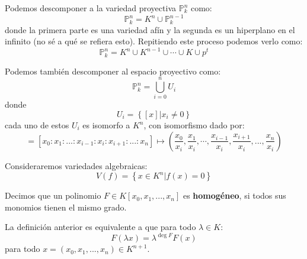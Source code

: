 \documentclass[12pt]{report}
\newcounter{it}
\theoremstyle{largebreak}
\begin{document}
    \begin{obs}
        Podemos descomponer a la variedad proyectiva $\mathbb{P}^n_k$ como:
        \begin{equation*}
            \mathbb{P}^n_k=K^n\cup \mathbb{P}^{ n-1}_k
        \end{equation*}
        donde la primera parte es una variedad afín y la segunda es un hiperplano en el infinito (no sé a qué se refiera esto). Repitiendo este proceso podemos verlo como:
        \begin{equation*}
            \mathbb{P}^n_k=K^n\cup K^{ n-1}\cup\cdots\cup K\cup p^t
        \end{equation*}
    \end{obs}

    \begin{obs}
        Podemos también descomponer al espacio proyectivo como:
        \begin{equation*}
            \mathbb{P}^n_k=\bigcup_{ i=0}^n U_i
        \end{equation*}
        donde
        \begin{equation*}
            U_i=\left\{[x]\Big|x_i\neq0 \right\}
        \end{equation*}
        cada uno de estos $U_i$ es isomorfo a $K^n$, con isomorfismo dado por:
        \begin{equation*}
            [x]=[x_0:x_1:...:x_{ i-1}:x_i:x_{ i+1}:...:x_n]\mapsto \left(\frac{x_0}{x_i},\frac{x_1}{x_i},\cdots,\frac{x_{ i-1}}{x_i},\frac{x_{ i+1}}{x_i},...,\frac{x_n}{x_i} \right)
        \end{equation*}
    \end{obs}

    Consideraremos variedades algebraicas:
    \begin{equation*}
        V(f)=\left\{x\in K^n\Big|f(x)=0 \right\}
    \end{equation*}

    \begin{mydef}
        Decimos que un polinomio $F\in K[x_0,x_1,...,x_n]$ es \textbf{homogéneo}, si todos sus monomios tienen el mismo grado.
    \end{mydef}

    \begin{obs}
        La definición anterior es equivalente a que para todo $\lambda\in K$:
        \begin{equation*}
            F(\lambda x)=\lambda^{\deg F}F(x)
        \end{equation*}
        para todo $x=(x_0,x_1,...,x_n)\in K^{ n+1}$.
    \end{obs}
\end{document}
